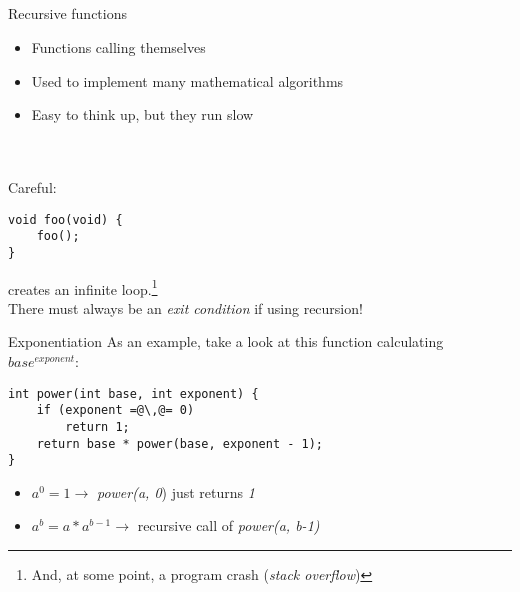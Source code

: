 \subsection{}
\begin{frame}[fragile]{Recursive functions}
	\begin{itemize}
		\item Functions calling themselves
		\item Used to implement many mathematical algorithms
		\item Easy to think up, but they run slow
	\end{itemize} \ \\ \ \\
	Careful:
	\begin{lstlisting}
void foo(void) {
	foo();
}
\end{lstlisting}
	creates an infinite loop.\footnote{And, at some point, a program crash (\textit{stack overflow})} \\
	There must always be an \textit{exit condition} if using recursion!
\end{frame}
\begin{frame}[fragile]{Exponentiation}
As an example, take a look at this function calculating $base^{exponent}$:
	\begin{lstlisting}
int power(int base, int exponent) {
	if (exponent =@\,@= 0)
		return 1;
	return base * power(base, exponent - 1);
}
\end{lstlisting}
	\begin{itemize}
		\item $a^{0} = 1 \rightarrow$ \textit{power(a, 0}) just returns \textit{1}
		\item $a^{b} = a * a^{b-1} \rightarrow$ recursive call of \textit{power(a, b-1)}
	\end{itemize}
\end{frame}

